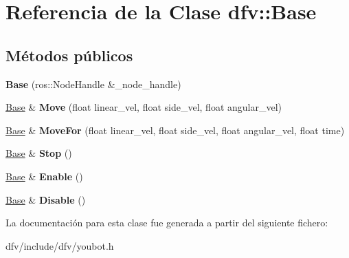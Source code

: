 \hypertarget{classdfv_1_1Base}{\section{\-Referencia de la \-Clase dfv\-:\-:\-Base}
\label{classdfv_1_1Base}
}
\subsection*{\-Métodos públicos}
\begin{DoxyCompactItemize}
\item 
\hypertarget{classdfv_1_1Base_a2b100a07979db6ab9b7416b220e56ea1}{{\bfseries \-Base} (ros\-::\-Node\-Handle \&\-\_\-node\-\_\-handle)}\label{classdfv_1_1Base_a2b100a07979db6ab9b7416b220e56ea1}

\item 
\hypertarget{classdfv_1_1Base_ad01c3d2429a5c96ec84bc28a2e3383f1}{\hyperlink{classdfv_1_1Base}{\-Base} \& {\bfseries \-Move} (float linear\-\_\-vel, float side\-\_\-vel, float angular\-\_\-vel)}\label{classdfv_1_1Base_ad01c3d2429a5c96ec84bc28a2e3383f1}

\item 
\hypertarget{classdfv_1_1Base_a0b94d4ef402c3dc09cc34e9d8f3ee048}{\hyperlink{classdfv_1_1Base}{\-Base} \& {\bfseries \-Move\-For} (float linear\-\_\-vel, float side\-\_\-vel, float angular\-\_\-vel, float time)}\label{classdfv_1_1Base_a0b94d4ef402c3dc09cc34e9d8f3ee048}

\item 
\hypertarget{classdfv_1_1Base_a7d1dff675ff8f6eeb34d0fa43d2df159}{\hyperlink{classdfv_1_1Base}{\-Base} \& {\bfseries \-Stop} ()}\label{classdfv_1_1Base_a7d1dff675ff8f6eeb34d0fa43d2df159}

\item 
\hypertarget{classdfv_1_1Base_a1a32c5ba00f99819cbdb981089aa7696}{\hyperlink{classdfv_1_1Base}{\-Base} \& {\bfseries \-Enable} ()}\label{classdfv_1_1Base_a1a32c5ba00f99819cbdb981089aa7696}

\item 
\hypertarget{classdfv_1_1Base_a538c9a6798fdf1622d697e0b17f4c8a7}{\hyperlink{classdfv_1_1Base}{\-Base} \& {\bfseries \-Disable} ()}\label{classdfv_1_1Base_a538c9a6798fdf1622d697e0b17f4c8a7}

\end{DoxyCompactItemize}


\-La documentación para esta clase fue generada a partir del siguiente fichero\-:\begin{DoxyCompactItemize}
\item 
dfv/include/dfv/youbot.\-h\end{DoxyCompactItemize}
